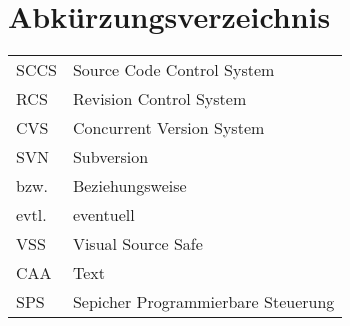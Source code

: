 \chapter*{Abkürzungsverzeichnis}
\begin{tabular}{ll}
SCCS & Source Code Control System \\ 
RCS & Revision Control System \\ 
CVS & Concurrent Version System \\
SVN & Subversion \\
bzw. & Beziehungsweise \\
evtl. & eventuell \\ 
VSS & Visual Source Safe \\
CAA & Text \\
SPS & Sepicher Programmierbare Steuerung \\
\end{tabular} 